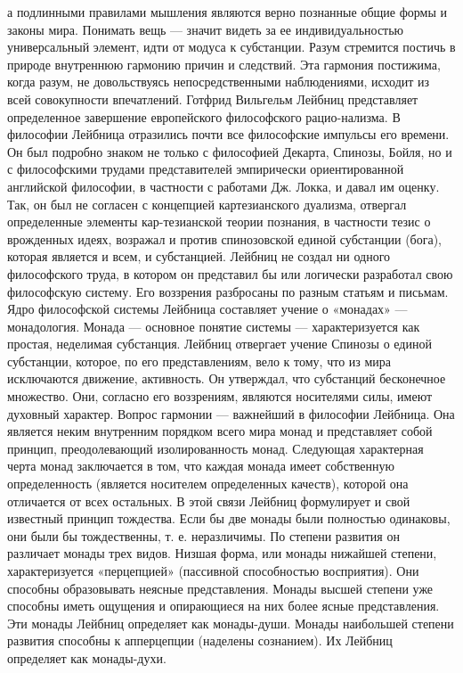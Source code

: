 \documentclass[12pt]{article}
\begin{document}
а подлинными правилами мышления являются верно познанные общие формы и законы мира. Понимать вещь
— значит видеть за ее индивидуальностью универсальный элемент, идти от модуса к субстанции. Разум
стремится постичь в природе внутреннюю гармонию причин и следствий. Эта гармония постижима, когда
разум, не довольствуясь непосредственными наблюдениями, исходит из всей совокупности впечатлений.
Готфрид Вильгельм Лейбниц представляет определенное завершение европейского философского рацио-нализма. В философии Лейбница отразились почти все философские импульсы его времени. Он был подробно
знаком не только с философией Декарта, Спинозы, Бойля, но и с философскими трудами представителей
эмпирически ориентированной английской философии, в частности с работами Дж. Локка, и давал им оценку.
Так, он был не согласен с концепцией картезианского дуализма, отвергал определенные элементы кар-тезианской теории познания, в частности тезис о врожденных идеях, возражал и против спинозовской единой
субстанции (бога), которая является и всем, и субстанцией.
Лейбниц не создал ни одного философского труда, в котором он представил бы или логически разработал свою
философскую систему. Его воззрения разбросаны по разным статьям и письмам.
Ядро философской системы Лейбница составляет учение о «монадах» — монадология. Монада — основное
понятие системы — характеризуется как простая, неделимая субстанция. Лейбниц отвергает учение Спинозы о
единой субстанции, которое, по его представлениям, вело к тому, что из мира исключаются движение,
активность. Он утверждал, что субстанций бесконечное множество. Они, согласно его воззрениям, являются
носителями силы, имеют духовный характер.
Вопрос гармонии — важнейший в философии Лейбница. Она является неким внутренним порядком всего мира
монад и представляет собой принцип, преодолевающий изолированность монад.
Следующая характерная черта монад заключается в том, что каждая монада имеет собственную определенность
(является носителем определенных качеств), которой она отличается от всех остальных. В этой связи Лейбниц
формулирует и свой известный принцип тождества. Если бы две монады были полностью одинаковы, они были
бы тождественны, т. е. неразличимы.
По степени развития он различает монады трех видов. Низшая форма, или монады нижайшей степени,
характеризуется «перцепцией» (пассивной способностью восприятия). Они способны образовывать неясные
представления. Монады высшей степени уже способны иметь ощущения и опирающиеся на них более ясные
представления. Эти монады Лейбниц определяет как монады-души. Монады наибольшей степени развития
способны к апперцепции (наделены сознанием). Их Лейбниц определяет как монады-духи.
\end{document}
